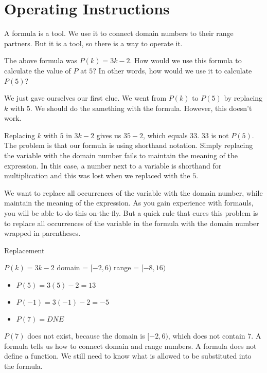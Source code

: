 \documentclass{ximera}
\begin{document}
\section{Operating Instructions}

A formula is a tool.  We use it to connect domain numbers to their range partners.  But it is a tool, so there is a way to operate it.



The above formula was $P(k) = 3k - 2$.  How would we use this formula to calculate the value of $P$ at $5$?   In other words, how would we use it to calculate $P(5)$?

We just gave ourselves our first clue. We went from $P(k)$ to $P(5)$ by replacing $k$ with $5$.  We should do the samething with the formula. However, this doesn't work.


Replacing $k$ with $5$ in $3k - 2$ gives us $35-2$, which equals $33$.  $33$ is not $P(5)$. The problem is that our formula is using shorthand notation. Simply replacing the variable with the domain number fails to maintain the meaning of the expression.  In this case, a number next to a variable is shorthand for multiplication and this was lost when we replaced with the $5$.

We want to replace all occurrences of the variable with the domain number, while maintain the meaning of the expression.  As you gain experience with formauls, you will be able to do this on-the-fly.  But a quick rule that cures this problem is to replace all occurrences of the variable in the formula with the domain number wrapped in parentheses.




  
\begin{example}   Replacement

$P(k) = 3k - 2$
domain = $[-2, 6)$
range = $[-8, 16)$


\begin{itemize}
\item $P(5) = 3(5) - 2 = 13$
\item $P(-1) = 3(-1) - 2 = -5$
\item $P(7) = DNE$
\end{itemize}


$P(7)$ does not exist, because the domain is $[-2, 6)$, which does not contain $7$.  A formula tells us how to connect domain and range numbers.  A formula does not define a function.  We still need to know what is allowed to be substituted into the formula.


\end{example}
\end{document}
